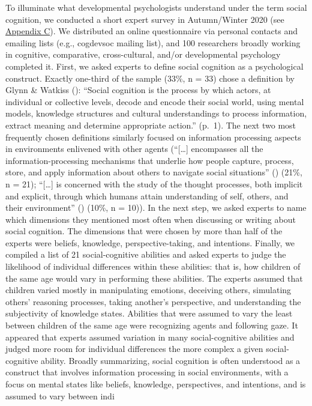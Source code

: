 \documentclass[
]{scrbook}
\begin{document}
To illuminate what developmental psychologists understand under the term social cognition, we conducted a short expert survey in Autumn/Winter 2020 (see \hyperref[appendixC]{Appendix C}). We distributed an online questionnaire via personal contacts and emailing lists (e.g., cogdevsoc mailing list), and 100 researchers broadly working in cognitive, comparative, cross-cultural, and/or developmental psychology completed it. First, we asked experts to define social cognition as a psychological construct. Exactly one-third of the sample (33\%, n = 33) chose a definition by Glynn \& Watkiss (): ``Social cognition is the process by which actors, at individual or collective levels, decode and encode their social world, using mental models, knowledge structures and cultural understandings to process information, extract meaning and determine appropriate action.'' (p.~1). The next two most frequently chosen definitions similarly focused on information processing aspects in environments enlivened with other agents (``{[}\ldots{]} encompasses all the information-processing mechanisms that underlie how people capture, process, store, and apply information about others to navigate social situations'' () (21\%, n = 21); ``{[}\ldots{]} is concerned with the study of the thought processes, both implicit and explicit, through which humans attain understanding of self, others, and their environment'' () (10\%, n = 10)). In the next step, we asked experts to name which dimensions they mentioned most often when discussing or writing about social cognition. The dimensions that were chosen by more than half of the experts were beliefs, knowledge, perspective-taking, and intentions. Finally, we compiled a list of 21 social-cognitive abilities and asked experts to judge the likelihood of individual differences within these abilities: that is, how children of the same age would vary in performing these abilities. The experts assumed that children varied mostly in manipulating emotions, deceiving others, simulating others' reasoning processes, taking another's perspective, and understanding the subjectivity of knowledge states. Abilities that were assumed to vary the least between children of the same age were recognizing agents and following gaze. It appeared that experts assumed variation in many social-cognitive abilities and judged more room for individual differences the more complex a given social-cognitive ability. Broadly summarizing, social cognition is often understood as a construct that involves information processing in social environments, with a focus on mental states like beliefs, knowledge, perspectives, and intentions, and is assumed to vary between indi
\end{document}
